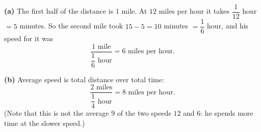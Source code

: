 \textbf{(a)} The first half of the distance is $1$ mile. At $12$ miles per hour it takes $\dfrac{1}{12}$ hour $=5$ minutes. So the second mile took $15-5=10$ minutes $=\dfrac{1}{6}$ hour, and his speed for it was
\[
\dfrac{1\text{ mile}}{\dfrac{1}{6}\text{ hour}}=\boxed{6\text{ miles per hour}}.
\]

\textbf{(b)} Average speed is total distance over total time:
\[
\dfrac{2\text{ miles}}{\dfrac{1}{4}\text{ hour}}=\boxed{8\text{ miles per hour}}.
\]
(Note that this is not the average $9$ of the two speeds $12$ and $6$: he spends more time at the slower speed.)

